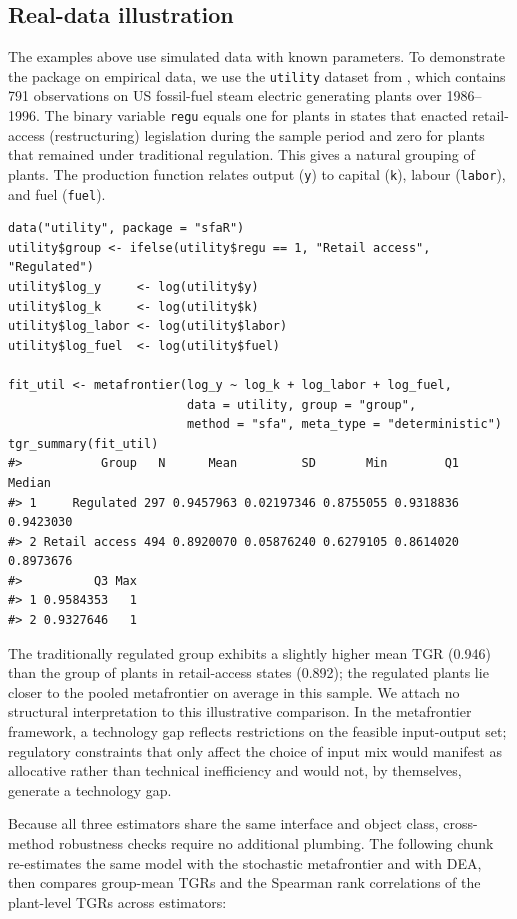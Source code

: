 \subsection{Real-data illustration}\label{sec:real-data}

The examples above use simulated data with known parameters. To demonstrate
the package on empirical data, we use the \texttt{utility} dataset from
, which contains 791 observations on US fossil-fuel steam
electric generating plants over 1986--1996. The binary variable \texttt{regu}
equals one for plants in states that enacted retail-access (restructuring)
legislation during the sample period and zero for plants that remained
under traditional regulation. This gives a natural grouping of plants. The
production function relates output (\texttt{y}) to capital (\texttt{k}), labour (\texttt{labor}),
and fuel (\texttt{fuel}).

\begin{verbatim}
data("utility", package = "sfaR")
utility$group <- ifelse(utility$regu == 1, "Retail access", "Regulated")
utility$log_y     <- log(utility$y)
utility$log_k     <- log(utility$k)
utility$log_labor <- log(utility$labor)
utility$log_fuel  <- log(utility$fuel)

fit_util <- metafrontier(log_y ~ log_k + log_labor + log_fuel,
                         data = utility, group = "group",
                         method = "sfa", meta_type = "deterministic")
tgr_summary(fit_util)
#>           Group   N      Mean         SD       Min        Q1    Median
#> 1     Regulated 297 0.9457963 0.02197346 0.8755055 0.9318836 0.9423030
#> 2 Retail access 494 0.8920070 0.05876240 0.6279105 0.8614020 0.8973676
#>          Q3 Max
#> 1 0.9584353   1
#> 2 0.9327646   1
\end{verbatim}

The traditionally regulated group exhibits a slightly higher mean TGR
(0.946) than the group of plants in retail-access states (0.892); the
regulated plants lie closer to the pooled metafrontier on average in this
sample. We attach no structural interpretation to this
illustrative comparison. In the metafrontier framework, a technology gap
reflects restrictions on the feasible input-output set; regulatory
constraints that only affect the choice of input mix would manifest as
allocative rather than technical inefficiency and would not, by
themselves, generate a technology gap.

Because all three estimators share the same interface and object class,
cross-method robustness checks require no additional plumbing. The
following chunk re-estimates the same model with the stochastic
metafrontier and with DEA, then compares group-mean TGRs and the Spearman
rank correlations of the plant-level TGRs across estimators:

